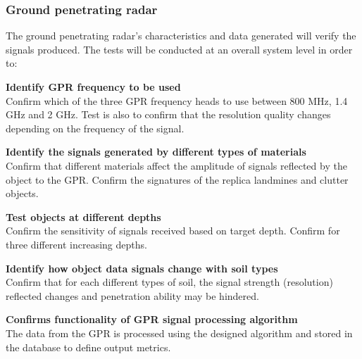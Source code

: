 \documentclass[main.tex]{subfiles}
\begin{document}
\begin{appendices}
\subsubsection{Ground penetrating radar}
The ground penetrating radar’s characteristics and data generated will verify the signals produced. The tests will be conducted at an overall system level in order to:
\begin{gpr}
\textbf{Identify GPR frequency to be used}\\
Confirm which of the three GPR frequency heads to use between 800 MHz, 1.4 GHz and 2 GHz. Test is also to confirm that the resolution quality changes depending on the frequency of the signal. 
\end{gpr}

\begin{gpr}
\textbf{Identify the signals generated by different types of materials}\\
Confirm that different materials affect the amplitude of signals reflected by the object to the GPR. Confirm the signatures of the replica landmines and clutter objects.
\end{gpr}

\begin{gpr}
\textbf{Test objects at different depths}\\
Confirm the sensitivity of signals received based on target depth. Confirm for three different increasing depths.
\end{gpr}
\begin{gpr}
\textbf{Identify how object data signals change with soil types}\\
Confirm that for each different types of soil, the signal strength (resolution) reflected changes and penetration ability may be hindered. 
\end{gpr}

\begin{gpr}
\textbf{Confirms functionality of GPR signal processing algorithm}\\
The data from the GPR is processed using the designed algorithm and stored in the database to define output metrics. 
\end{gpr}


\end{appendices}
\end{document}
